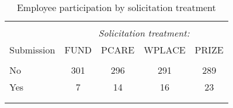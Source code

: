 \begin{table}
\centering
\caption{Employee participation by solicitation treatment}
\label{submit}
\begin{tabular}{@{}lcccc}
  \\[-1.8ex]\hline \hline \\[-1.8ex]
 & \multicolumn{4}{c}{\emph{Solicitation treatment:}}\\
						\cmidrule(lr){2-5} Submission & FUND & PCARE & WPLACE & PRIZE \\ 
  \hline \\[-1.86ex]
No & 301 & 296 & 291 & 289 \\ 
  Yes &  7 & 14 & 16 & 23 \\ 
   \\[-1.8ex]\hline \hline \\[-1.8ex]
\end{tabular}
\end{table}
